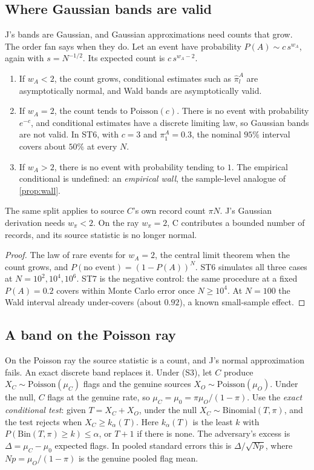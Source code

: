 \documentclass[11pt]{article}
\theoremstyle{definition}\newtheorem{definition}[theorem]{Definition}\newtheorem{remark}[theorem]{Remark}\newtheorem{example}[theorem]{Example}
\begin{document}
\subsection{Where Gaussian bands are valid}
J's bands are Gaussian, and Gaussian approximations need counts that grow. The order fan says when they do. Let an event have
probability $P(A)\sim c\,s^{w_A}$, again with $s=N^{-1/2}$. Its expected count is $c\,s^{w_A-2}$.

\begin{proposition}\label{prop:poisson}
\begin{enumerate}
\item[(1)] If $w_A<2$, the count grows, conditional estimates such as $\hat\pi^A_l$ are asymptotically normal, and Wald bands are
  asymptotically valid.
\item[(2)] If $w_A=2$, the count tends to $\mathrm{Poisson}(c)$. There is no event with probability $e^{-c}$, and conditional estimates have a discrete
  limiting law, so Gaussian bands are not valid. In ST6, with $c=3$ and $\pi^A_1=0.3$, the nominal $95\%$ interval covers about $50\%$ at every $N$.
\item[(3)] If $w_A>2$, there is no event with probability tending to $1$. The empirical conditional is undefined: an \emph{empirical wall}, the
  sample-level analogue of \cref{prop:wall}.
\end{enumerate}
The same split applies to source $C$'s own record count $\pi N$. J's Gaussian derivation needs $w_\pi<2$. On the ray $w_\pi=2$, C contributes a
bounded number of records, and its source statistic is no longer normal.
\end{proposition}

\begin{proof}
The law of rare events for $w_A=2$, the central limit theorem when the count grows, and $P(\text{no event})=(1-P(A))^N$. ST6 simulates all three
cases at $N=10^2,10^4,10^6$. ST7 is the negative control: the same procedure at a fixed $P(A)=0.2$ covers within Monte Carlo error once $N\ge10^4$.
At $N=100$ the Wald interval already under-covers (about $0.92$), a known small-sample effect.
\end{proof}

\subsection{A band on the Poisson ray}
On the Poisson ray the source statistic is a count, and J's normal approximation fails. An exact discrete band replaces it. Under (S3), let
$C$ produce $X_C\sim\mathrm{Poisson}(\mu_C)$ flags and the genuine sources $X_O\sim\mathrm{Poisson}(\mu_O)$. Under the null, $C$ flags at the genuine rate, so
$\mu_C=\mu_0=\pi\mu_O/(1-\pi)$. Use the \emph{exact conditional test}: given $T=X_C+X_O$, under the null $X_C\sim\mathrm{Binomial}(T,\pi)$, and the test rejects
when $X_C\ge k_\alpha(T)$. Here $k_\alpha(T)$ is the least $k$ with $P(\mathrm{Bin}(T,\pi)\ge k)\le\alpha$, or $T+1$ if there is none. The adversary's excess is
$\Delta=\mu_C-\mu_0$ expected flags. In pooled standard errors this is $\Delta/\sqrt{Np}$, where $Np=\mu_O/(1-\pi)$ is the genuine pooled flag mean.
\end{document}
